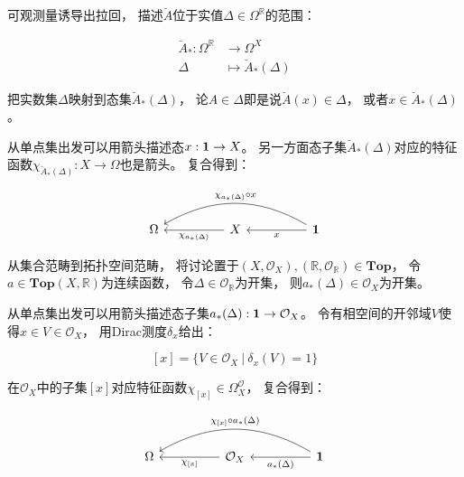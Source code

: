 \documentclass[10pt, openany]{book}
\begin{document}
可观测量诱导出拉回，
描述$\breve A$位于实值$\Delta \in \Omega^\mathbb R$的范围：

$$
\begin{aligned}
\breve A_*: \Omega^\mathbb R &\to \Omega^X \\
\Delta &\mapsto \breve A_*(\Delta)
\end{aligned}
$$

把实数集$\Delta$映射到态集$\breve A_*(\Delta)$，
论$A \in \Delta$即是说$\breve A(x) \in \Delta$，
或者$x \in \breve A_*(\Delta)$。

从单点集出发可以用箭头描述态$x: \textbf 1 \to X$。
另一方面态子集$\breve A_*(\Delta)$对应的特征函数$\chi_{\breve A_*(\Delta)}: X \to \Omega$也是箭头。
复合得到：

$$
\begin{tikzcd}
\Omega &  & X \arrow[ll, "\chi_{a_*(\Delta)}"] &  & \textbf 1 \arrow[ll, "x"] \arrow[llll, "\chi_{a_*(\Delta)} \circ x"', bend right]
\end{tikzcd}
$$

从集合范畴到拓扑空间范畴，
将讨论置于$(X,\mathcal O_X),(\mathbb R,\mathcal O_\mathbb R) \in \textbf{Top}$，
令$a \in \textbf{Top}(X,\mathbb R)$为连续函数，
令$\Delta \in \mathcal O_\mathbb R$为开集，
则$a_*(\Delta) \in \mathcal O_X$为开集。

从单点集出发可以用箭头描述态子集$a_*(\Delta): \textbf 1 \to \mathcal O_X$。
令有相空间的开邻域$V$使得$x \in V \in \mathcal O_X$，
用Dirac测度$\delta_x$给出：

$$
[x] = \{ V \in \mathcal O_X \ | \ \delta_x(V)=1 \}
$$

在$\mathcal O_X$中的子集$[x]$对应特征函数$\chi_{[x]} \in \Omega^{\mathcal O}_X$，
复合得到：

$$
\begin{tikzcd}
\Omega &  & \mathcal O_X \arrow[ll, "{\chi_{[x]}}"] &  & \textbf 1 \arrow[ll, "a_*(\Delta)"] \arrow[llll, "{\chi_{[x]} \circ a_*(\Delta)}"', bend right]
\end{tikzcd}
$$
\end{document}
